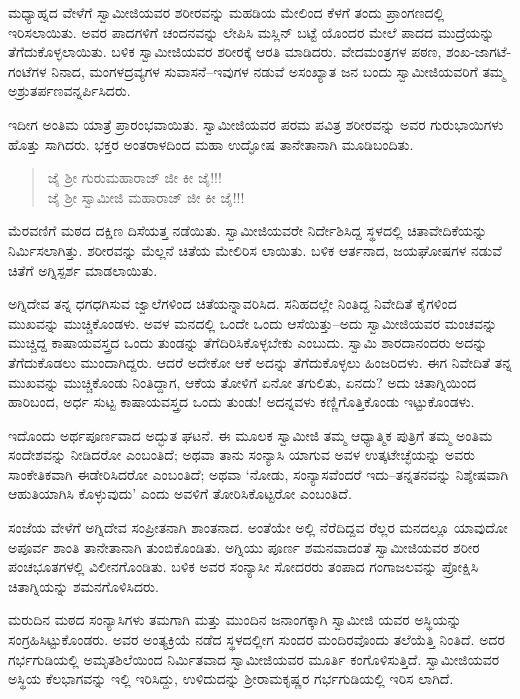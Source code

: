 ಮಧ್ಯಾಹ್ನದ ವೇಳೆಗೆ ಸ್ವಾಮೀಜಿಯವರ ಶರೀರವನ್ನು ಮಹಡಿಯ ಮೇಲಿಂದ ಕೆಳಗೆ ತಂದು ಪ್ರಾಂಗಣದಲ್ಲಿ ಇರಿಸಲಾಯಿತು. ಅವರ ಪಾದಗಳಿಗೆ ಚಂದನವನ್ನು ಲೇಪಿಸಿ ಮಸ್ಲಿನ್ ಬಟ್ಟೆ ಯೊಂದರ ಮೇಲೆ ಪಾದದ ಮುದ್ರೆಯನ್ನು ತೆಗೆದುಕೊಳ್ಳಲಾಯಿತು. ಬಳಿಕ ಸ್ವಾಮೀಜಿಯವರ ಶರೀರಕ್ಕೆ ಆರತಿ ಮಾಡಿದರು. ವೇದಮಂತ್ರಗಳ ಪಠಣ, ಶಂಖ-ಜಾಗಟೆ-ಗಂಟೆಗಳ ನಿನಾದ, ಮಂಗಳದ್ರವ್ಯಗಳ ಸುವಾಸನೆ–ಇವುಗಳ ನಡುವೆ ಅಸಂಖ್ಯಾತ ಜನ ಬಂದು ಸ್ವಾಮೀಜಿಯವರಿಗೆ ತಮ್ಮ ಅಶ್ರುತರ್ಪಣವನ್ನರ್ಪಿಸಿದರು.

ಇದೀಗ ಅಂತಿಮ ಯಾತ್ರೆ ಪ್ರಾರಂಭವಾಯಿತು. ಸ್ವಾಮೀಜಿಯವರ ಪರಮ ಪವಿತ್ರ ಶರೀರವನ್ನು ಅವರ ಗುರುಭಾಯಿಗಳು ಹೊತ್ತು ಸಾಗಿದರು. ಭಕ್ತರ ಅಂತರಾಳದಿಂದ ಮಹಾ ಉದ್ಘೋಷ ತಾನೇತಾನಾಗಿ ಮೂಡಿಬಂದಿತು.

\begin{verse}
ಜೈ ಶ್ರೀ ಗುರುಮಹಾರಾಜ್ ಜೀ ಕೀ ಜೈ!!!\\ಜೈ ಶ್ರೀ ಸ್ವಾಮೀಜಿ ಮಹಾರಾಜ್ ಜೀ ಕೀ ಜೈ!!!
\end{verse}

ಮೆರವಣಿಗೆ ಮಠದ ದಕ್ಷಿಣ ದಿಸೆಯತ್ತ ನಡೆಯಿತು. ಸ್ವಾಮೀಜಿಯವರೇ ನಿರ್ದೇಶಿಸಿದ್ದ ಸ್ಥಳದಲ್ಲಿ ಚಿತಾವೇದಿಕೆಯನ್ನು ನಿರ್ಮಿಸಲಾಗಿತ್ತು. ಶರೀರವನ್ನು ಮೆಲ್ಲನೆ ಚಿತೆಯ ಮೇಲಿರಿಸ ಲಾಯಿತು. ಬಳಿಕ ಆರ್ತನಾದ, ಜಯಘೋಷಗಳ ನಡುವೆ ಚಿತೆಗೆ ಅಗ್ನಿಸ್ಪರ್ಶ ಮಾಡಲಾಯಿತು.

ಅಗ್ನಿದೇವ ತನ್ನ ಧಗಧಗಿಸುವ ಜ್ವಾಲೆಗಳಿಂದ ಚಿತೆಯನ್ನಾವರಿಸಿದ. ಸನಿಹದಲ್ಲೇ ನಿಂತಿದ್ದ ನಿವೇದಿತೆ ಕೈಗಳಿಂದ ಮುಖವನ್ನು ಮುಚ್ಚಿಕೊಂಡಳು. ಅವಳ ಮನದಲ್ಲಿ ಒಂದೇ ಒಂದು ಆಸೆಯಿತ್ತು–ಅದು ಸ್ವಾಮೀಜಿಯವರ ಮಂಚವನ್ನು ಮುಚ್ಚಿದ್ದ ಕಾಷಾಯವಸ್ತ್ರದ ಒಂದು ತುಂಡನ್ನು ತೆಗೆದಿರಿಸಿಕೊಳ್ಳಬೇಕು ಎಂಬುದು. ಸ್ವಾಮಿ ಶಾರದಾನಂದರು ಅದನ್ನು ತೆಗೆದುಕೊಡಲು ಮುಂದಾಗಿದ್ದರು. ಆದರೆ ಅದೇಕೋ ಆಕೆ ಅದನ್ನು ತೆಗೆದುಕೊಳ್ಳಲು ಹಿಂಜರಿದಳು. ಈಗ ನಿವೇದಿತೆ ತನ್ನ ಮುಖವನ್ನು ಮುಚ್ಚಿಕೊಂಡು ನಿಂತಿದ್ದಾಗ, ಆಕೆಯ ತೋಳಿಗೆ ಏನೋ ತಗುಲಿತು, ಏನದು? ಅದು ಚಿತಾಗ್ನಿಯಿಂದ ಹಾರಿಬಂದ, ಅರ್ಧ ಸುಟ್ಟ ಕಾಷಾಯವಸ್ತ್ರದ ಒಂದು ತುಂಡು! ಅದನ್ನವಳು ಕಣ್ಣಿಗೊತ್ತಿಕೊಂಡು ಇಟ್ಟುಕೊಂಡಳು.

ಇದೊಂದು ಅರ್ಥಪೂರ್ಣವಾದ ಅದ್ಭುತ ಘಟನೆ. ಈ ಮೂಲಕ ಸ್ವಾಮೀಜಿ ತಮ್ಮ ಆಧ್ಯಾತ್ಮಿಕ ಪುತ್ರಿಗೆ ತಮ್ಮ ಅಂತಿಮ ಸಂದೇಶವನ್ನು ನೀಡಿದರೋ ಎಂಬಂತಿದೆ; ಅಥವಾ ತಾನು ಸಂನ್ಯಾಸಿ ಯಾಗುವ ಅವಳ ಉತ್ಕಟೇಚ್ಛೆಯನ್ನು ಅವರು ಸಾಂಕೇತಿಕವಾಗಿ ಈಡೇರಿಸಿದರೋ ಎಂಬಂತಿದೆ; ಅಥವಾ ‘ನೋಡು, ಸಂನ್ಯಾಸವೆಂದರೆ ಇದು–ತನ್ನತನವನ್ನು ನಿಶ್ಶೇಷವಾಗಿ ಆಹುತಿಯಾಗಿಸಿ ಕೊಳ್ಳುವುದು’ ಎಂದು ಅವಳಿಗೆ ತೋರಿಸಿಕೊಟ್ಟರೋ ಎಂಬಂತಿದೆ.

ಸಂಜೆಯ ವೇಳೆಗೆ ಅಗ್ನಿದೇವ ಸಂಪ್ರೀತನಾಗಿ ಶಾಂತನಾದ. ಅಂತೆಯೇ ಅಲ್ಲಿ ನೆರೆದಿದ್ದವ ರೆಲ್ಲರ ಮನದಲ್ಲೂ ಯಾವುದೋ ಅಪೂರ್ವ ಶಾಂತಿ ತಾನೇತಾನಾಗಿ ತುಂಬಿಕೊಂಡಿತು. ಅಗ್ನಿಯು ಪೂರ್ಣ ಶಮನವಾದಂತೆ ಸ್ವಾಮೀಜಿಯವರ ಶರೀರ ಪಂಚಭೂತಗಳಲ್ಲಿ ವಿಲೀನಗೊಂಡಿತು. ಬಳಿಕ ಅವರ ಸಂನ್ಯಾಸೀ ಸೋದರರು ತಂಪಾದ ಗಂಗಾಜಲವನ್ನು ಪ್ರೋಕ್ಷಿಸಿ ಚಿತಾಗ್ನಿಯನ್ನು ಶಮನಗೊಳಿಸಿದರು.

ಮರುದಿನ ಮಠದ ಸಂನ್ಯಾಸಿಗಳು ತಮಗಾಗಿ ಮತ್ತು ಮುಂದಿನ ಜನಾಂಗಕ್ಕಾಗಿ ಸ್ವಾಮೀಜಿ ಯವರ ಅಸ್ಥಿಯನ್ನು ಸಂಗ್ರಹಿಸಿಟ್ಟುಕೊಂಡರು. ಅವರ ಅಂತ್ಯಕ್ರಿಯೆ ನಡೆದ ಸ್ಥಳದಲ್ಲೀಗ ಸುಂದರ ಮಂದಿರವೊಂದು ತಲೆಯೆತ್ತಿ ನಿಂತಿದೆ. ಅದರ ಗರ್ಭಗುಡಿಯಲ್ಲಿ ಅಮೃತಶಿಲೆಯಿಂದ ನಿರ್ಮಿತವಾದ ಸ್ವಾಮೀಜಿಯವರ ಮೂರ್ತಿ ಕಂಗೊಳಿಸುತ್ತಿದೆ. ಸ್ವಾಮೀಜಿಯವರ ಅಸ್ಥಿಯ ಕೆಲಭಾಗವನ್ನು ಇಲ್ಲಿ ಇರಿಸಿದ್ದು, ಉಳಿದುದನ್ನು ಶ್ರೀರಾಮಕೃಷ್ಣರ ಗರ್ಭಗುಡಿಯಲ್ಲಿ ಇರಿಸ ಲಾಗಿದೆ.

